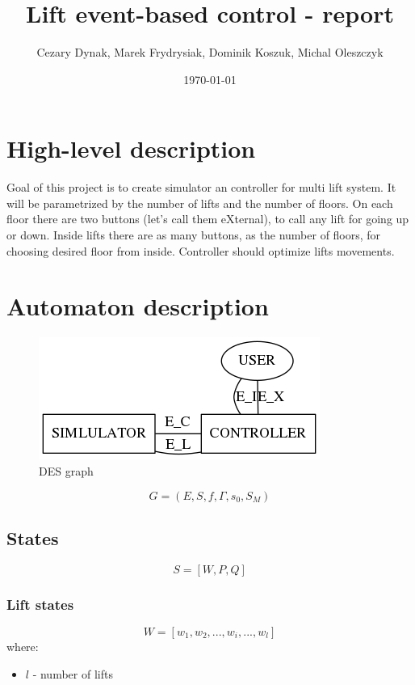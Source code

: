 \documentclass{article}
\begin{document}
\title{Lift event-based control - report}
\author{Cezary Dynak, Marek Frydrysiak, Dominik Koszuk, Michal Oleszczyk} 
\date{\today}
\maketitle

\section{High-level description}

Goal of this project is to create simulator an controller for multi lift
system. It will be parametrized by the number of lifts and the number
of floors. On each floor there are two buttons (let's call them eXternal),
to call any lift for going up or down. Inside lifts there are as many buttons,
as the number of floors, for choosing desired floor from inside. Controller
should optimize lifts movements.

\section{Automaton description}

\begin{figure}
  \centering
  \includegraphics{img/simulator_controller.png}
  \caption{DES graph}
\end{figure}

\[
G = (E, S, f, \Gamma, s_0, S_M)
\]

\subsection{States}

\[
S = [W, P, Q]
\]

\subsubsection{Lift states}

\[ W=[w_1, w_2, ..., w_i, ..., w_l ]\]
where:
\begin{itemize}
  \item \(l\) - number of lifts
\end{itemize}
\end{document}
